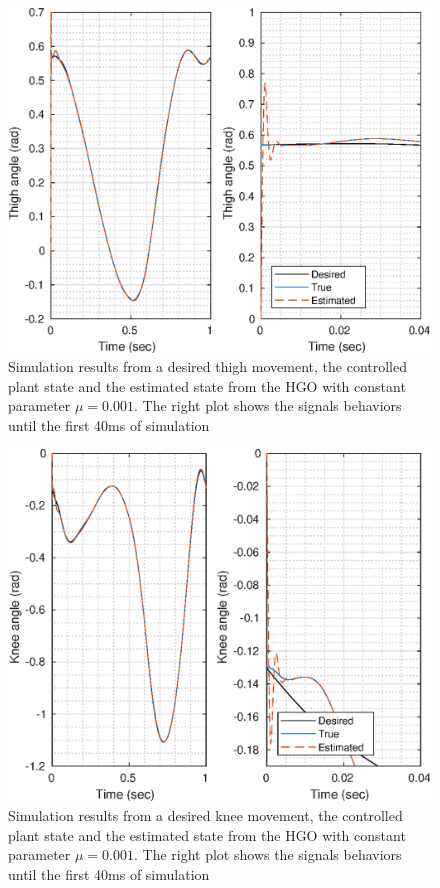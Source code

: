 \documentclass[letterpaper, 10 pt, conference]{ieeeconf}  %
\theoremstyle{plain}
\theoremstyle{definition}
\theoremstyle{remark}
\begin{document}
\begin{figure}[h!]
	\begin{center}
	\includegraphics[width = \columnwidth]{Figs/q_thigh_mu_1e-03.eps}
	\caption{ Simulation results from a desired thigh movement, the controlled plant state and the estimated state from the HGO with constant parameter $\mu=0.001$. The right plot shows the signals behaviors until the first 40ms of simulation}
	\label{fig:thigh}
	\end{center}
\end{figure}
%
%
\begin{figure}[h!]
	\begin{center}
	\includegraphics[width = \columnwidth]{Figs/q_knee_mu_1e-03.eps}
	\caption{ Simulation results from a desired knee movement, the controlled plant state and the estimated state from the HGO with constant parameter $\mu=0.001$. The right plot shows the signals behaviors until the first 40ms of simulation}
	\label{fig:knee}
	\end{center}
\end{figure}
\end{document}
